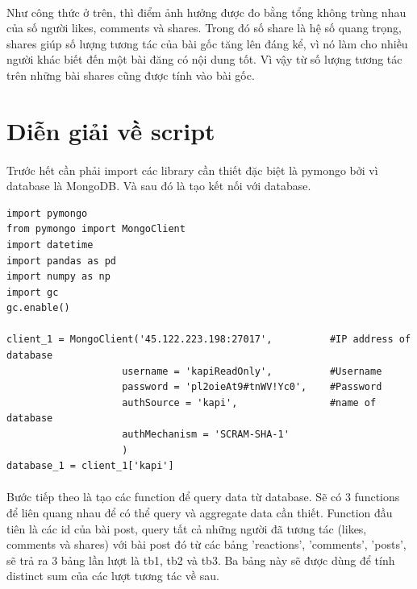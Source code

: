 \documentclass[12pt]{article}
\numberwithin{equation}{section}
\begin{document}
\paragraph{} Như công thức ở trên, thì điểm ảnh hưởng được đo bằng tổng không trùng nhau của số người likes, comments và shares. Trong đó số share là hệ số quang trọng, shares giúp số lượng tương tác của bài gốc tăng lên đáng kể, vì nó làm cho nhiều người khác biết đến một bài đăng có nội dung tốt. Vì vậy từ số lượng tương tác trên những bài shares cũng được tính vào bài gốc.

\section{Diễn giải về script}

\paragraph{} Trước hết cần phải import các library cần thiết đặc biệt là pymongo bởi vì database là MongoDB. Và sau đó là tạo kết nối với database.

\begin{lstlisting}
import pymongo
from pymongo import MongoClient
import datetime
import pandas as pd
import numpy as np
import gc
gc.enable()

client_1 = MongoClient('45.122.223.198:27017',        	#IP address of database
                    username = 'kapiReadOnly', 			#Username
                    password = 'pl2oieAt9#tnWV!Yc0',    #Password
                    authSource = 'kapi',                #name of database
                    authMechanism = 'SCRAM-SHA-1'
                    )
database_1 = client_1['kapi']

\end{lstlisting}

\paragraph{} Bước tiếp theo là tạo các function để query data từ database. Sẽ có 3 functions để liên quang nhau để có thể query và aggregate data cần thiết. Function đầu tiên là các id của bài post, query tất cả những người đã tương tác (likes, comments và shares) với bài post đó từ các bảng 'reactions', 'comments', 'posts', sẽ trả ra 3 bảng lần lượt là tb1, tb2 và tb3. Ba bảng này sẽ được dùng để tính distinct sum của các lượt tương tác về sau.
\\
\end{document}
